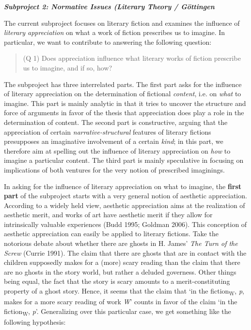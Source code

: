 
\vspace{.2cm}
\noindent\textbf{\emph{Subproject 2: Normative Issues (Literary Theory / G\"ottingen}}
\vspace{.1cm}


\noindent The current subproject focuses on literary fiction and examines the
influence of \emph{literary appreciation} on what a work of fiction
prescribes us to imagine. In particular, we want to contribute to
answering the following question:

\vspace{-.2cm}
\begin{quote}
(Q 1) Does appreciation influence what literary works of fiction
prescribe us to imagine, and if so, how?
\end{quote}
\vspace{-.2cm}

\noindent The subproject has three interrelated parts. The first part asks for the
influence of literary appreciation on the determination of fictional
\emph{content}, i.e. on \emph{what} to imagine. This part is mainly
analytic in that it tries to uncover the structure and force of
arguments in favor of the thesis that appreciation does play a role in
the determination of content. The second part is constructive, arguing
that the appreciation of certain \emph{narrative-structural} features of
literary fictions presupposes an imaginative involvement of a certain
\emph{kind}; in this part, we therefore aim at spelling out the
influence of literary appreciation on \emph{how} to imagine a particular
content. The third part is mainly speculative in focusing on
implications of both ventures for the very notion of prescribed
imaginings.

 In asking for the influence of literary appreciation on what to
imagine, the \textbf{first part} of the subproject starts with a very
general notion of aesthetic appreciation. According to a widely held
view, aesthetic appreciation aims at the realization of aesthetic merit,
and works of art have aesthetic merit if they allow for intrinsically
valuable experiences (Budd 1995; Goldman 2006). This conception of
aesthetic appreciation can easily be applied to literary fictions. Take
the notorious debate about whether there are ghosts in H. James'
\emph{The Turn of the Screw} (Currie 1991). The claim that there are
ghosts that are in contact with the children supposedly makes for a
(more) scary reading than the claim that there are no ghosts in the
story world, but rather a deluded governess. Other things being equal,
the fact that the story is scary amounts to a merit-constituting
property of a ghost story. Hence, it seems that the claim that `in the
fiction\textsubscript{W}, \emph{p}, makes for a more scary reading of
work \emph{W}' counts in favor of the claim `in the
fiction\textsubscript{W}, \emph{p}'. Generalizing over this particular
case, we get something like the following hypothesis:

